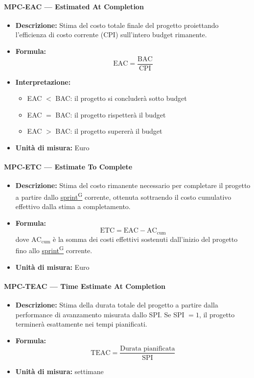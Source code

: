\documentclass[a4paper,12pt]{article}
\providecommand{\glslink}[2]{\href{https://alittlebyte-19.github.io/Documentazione/glossario.html\#gls-#1}{\underline{#2}\textsuperscript{\scriptsize G}}}
\begin{document}
\paragraph{MPC-EAC --- Estimated At Completion}
\begin{itemize}
    \item \textbf{Descrizione:} Stima del costo totale finale del progetto proiettando l'efficienza di costo corrente (CPI) sull'intero budget rimanente.
    \item \textbf{Formula:}
    $$\text{EAC} = \frac{\text{BAC}}{\text{CPI}}$$
    \item \textbf{Interpretazione:}
    \begin{itemize}
        \item EAC $<$ BAC: il progetto si concluderà sotto budget
        \item EAC $=$ BAC: il progetto rispetterà il budget
        \item EAC $>$ BAC: il progetto supererà il budget
    \end{itemize}
    \item \textbf{Unità di misura:} Euro
\end{itemize}

\paragraph{MPC-ETC --- Estimate To Complete}
\begin{itemize}
    \item \textbf{Descrizione:} Stima del costo rimanente necessario per completare il progetto a partire dallo \glslink{sprint}{sprint} corrente, ottenuta sottraendo il costo cumulativo effettivo dalla stima a completamento.
    \item \textbf{Formula:}
    $$\text{ETC} = \text{EAC} - \text{AC}_{\text{cum}}$$
    dove $\text{AC}_{\text{cum}}$ è la somma dei costi effettivi sostenuti dall'inizio del progetto fino allo \glslink{sprint}{sprint} corrente.
    \item \textbf{Unità di misura:} Euro
\end{itemize}

\paragraph{MPC-TEAC --- Time Estimate At Completion}
\begin{itemize}
    \item \textbf{Descrizione:} Stima della durata totale del progetto a partire dalla performance di avanzamento misurata dallo SPI. Se SPI $= 1$, il progetto terminerà esattamente nei tempi pianificati.
    \item \textbf{Formula:}
    $$\text{TEAC} = \frac{\text{Durata pianificata}}{\text{SPI}}$$
    \item \textbf{Unità di misura:} settimane
\end{itemize}
\end{document}
